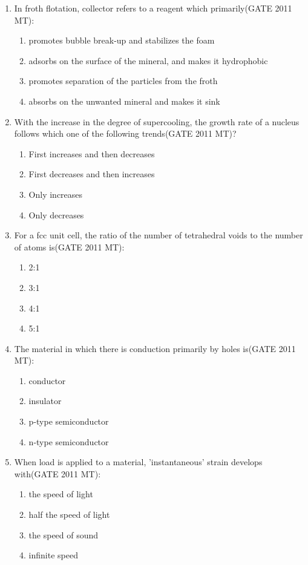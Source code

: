 \documentclass[12pt]{article}
\begin{document}
\begin{enumerate}
\item In froth flotation, collector refers to a reagent which primarily(GATE 2011 MT):
    \begin{enumerate}
        \item promotes bubble break-up and stabilizes the foam
        \item adsorbs on the surface of the mineral, and makes it hydrophobic
        \item promotes separation of the particles from the froth
        \item absorbs on the unwanted mineral and makes it sink
    \end{enumerate}

\item With the increase in the degree of supercooling, the growth rate of a nucleus follows which one of the following trends(GATE 2011 MT)?
    \begin{enumerate}
        \item First increases and then decreases
        \item First decreases and then increases
        \item Only increases
        \item Only decreases
    \end{enumerate}

\item For a fcc unit cell, the ratio of the number of tetrahedral voids to the number of atoms is(GATE 2011 MT):
    \begin{enumerate}
        \item 2:1
        \item 3:1
        \item 4:1
        \item 5:1
    \end{enumerate}

\item The material in which there is conduction primarily by holes is(GATE 2011 MT):
    \begin{enumerate}
        \item conductor
        \item insulator
        \item p-type semiconductor
        \item n-type semiconductor
    \end{enumerate}

\item When load is applied to a material, 'instantaneous' strain develops with(GATE 2011 MT):
    \begin{enumerate}
        \item the speed of light
        \item half the speed of light
        \item the speed of sound
        \item infinite speed
    \end{enumerate}


\end{enumerate}
\end{document}
